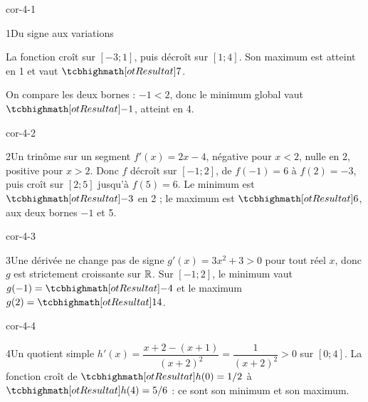 \corrigesSouples

\begin{blocLivre}{cor-4-1}
\begin{corrige}{1}{Du signe aux variations}
\begin{questions}\item La fonction croît sur $[-3;1]$, puis décroît sur $[1;4]$.
Son maximum est atteint en 1 et vaut $\res{7}$.
\item On compare les deux bornes : $-1<2$, donc le minimum global vaut
$\res{-1}$, atteint en 4.
\end{questions}
\label{figlivre-r04-01-var-cor}

\end{corrige}
\end{blocLivre}
\begin{blocLivre}{cor-4-2}
\begin{corrige}{2}{Un trinôme sur un segment}
$f'(x)=2x-4$, négative pour $x<2$, nulle en 2, positive pour $x>2$.
Donc $f$ décroît sur $[-1;2]$, de $f(-1)=6$ à $f(2)=-3$, puis croît
sur $[2;5]$ jusqu'à $f(5)=6$.
Le minimum est $\res{-3}$ en 2 ; le maximum est $\res{6}$, aux deux bornes $-1$ et 5.
\label{figlivre-r04-02-var-cor}

\end{corrige}
\end{blocLivre}
\begin{blocLivre}{cor-4-3}
\begin{corrige}{3}{Une dérivée ne change pas de signe}
$g'(x)=3x^2+3>0$ pour tout réel $x$, donc $g$ est strictement croissante sur $\mathbb{R}$.
Sur $[-1;2]$, le minimum vaut $g(-1)=\res{-4}$ et le maximum $g(2)=\res{14}$.
\label{figlivre-r04-03-var-cor}

\end{corrige}
\end{blocLivre}
\begin{blocLivre}{cor-4-4}
\begin{corrige}{4}{Un quotient simple}
$h'(x)=\dfrac{x+2-(x+1)}{(x+2)^2}=\dfrac1{(x+2)^2}>0$ sur $[0;4]$.
La fonction croît de $\res{h(0)=1/2}$ à $\res{h(4)=5/6}$ : ce sont son
minimum et son maximum.
\label{figlivre-r04-04-var-cor}

\end{corrige}
\end{blocLivre}
